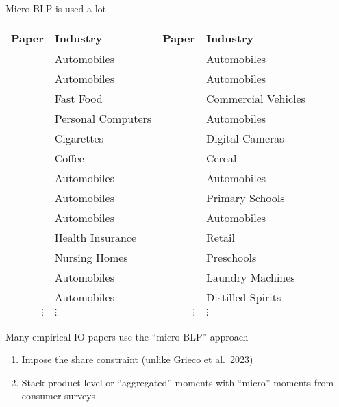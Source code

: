 \begin{frame}{Micro BLP is used a lot}
    \vspace{0.5em}
    \scriptsize
    \begin{tabular}{rlrl}
        Paper & Industry & Paper & Industry \\
        \midrule
        \cite*{petrin2002quantifying} & Automobiles & \cite*{barwick2017local} & Automobiles \\
        \cite*{berry2004differentiated} & Automobiles & \cite*{murry2017advertising} & Automobiles \\
        \cite*{thomadsen2005effect} & Fast Food & \cite*{wollmann2018trucks} & Commercial Vehicles \\
        \cite*{goeree2008limited} & Personal Computers & \cite*{li2018better} & Automobiles \\
        \cite*{ciliberto2010public} & Cigarettes & \cite*{li2018empirical} & Digital Cameras \\
        \cite*{nakamura2010accounting} & Coffee & \cite*{backus2021common} & Cereal \\
        \cite*{beresteanu2011gasoline} & Automobiles & \cite*{grieco2021evolution} & Automobiles \\
        \cite*{li2012traffic} & Automobiles & \cite*{neilson2021targeted} & Primary Schools \\
        \cite*{copeland2014intertemporal} & Automobiles & \cite*{armitage2022regulatory} & Automobiles \\
        \cite*{starc2014insurer} & Health Insurance & \cite*{dopper2022rising} & Retail \\
        \cite*{ching2015quantifying} & Nursing Homes & \cite*{bodere2023dynamic} & Preschools \\
        \cite*{li2015price} & Automobiles & \cite*{montag2023mergers} & Laundry Machines \\
        \cite*{nurski2016exclusive} & Automobiles & \cite*{conlon2023market} & Distilled Spirits \\
        $\vdots$ & $\vdots$ & $\vdots$ & $\vdots$
    \end{tabular}
    \normalsize
    \vspace{0.5em}
    \begin{wideitemize}
        \item Many empirical IO papers use the ``micro BLP'' approach
        \begin{enumerate}
            \item Impose the \cite{berry1995automobile} share constraint (unlike {\color{light gray}Grieco et al.\ 2023}) \nocite{grieco2023conformant}
            \item Stack product-level or ``\alert{aggregated}'' moments with ``\alert{micro}'' moments from consumer surveys
        \end{enumerate}
    \end{wideitemize}
\end{frame}

